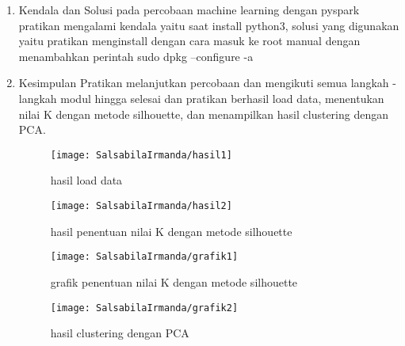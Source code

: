 \begin{enumerate}
\item Kendala dan Solusi
\newline pada percobaan machine learning dengan pyspark pratikan mengalami kendala yaitu saat install python3, solusi yang digunakan yaitu pratikan menginstall dengan cara masuk ke root manual dengan menambahkan perintah sudo dpkg --configure -a

\item Kesimpulan
\newline Pratikan melanjutkan percobaan dan mengikuti semua langkah - langkah modul hingga selesai dan pratikan berhasil load data, menentukan nilai K dengan metode silhouette, dan menampilkan hasil clustering dengan PCA.
\begin{figure}[!ht]
\texttt{[image: SalsabilaIrmanda/hasil1]}
\caption{hasil load data}
\label{gam:hasil}
\end{figure}

\begin{figure}[!ht]
\texttt{[image: SalsabilaIrmanda/hasil2]}
\caption{hasil penentuan nilai K dengan metode silhouette}
\label{gam:hasil}
\end{figure}

\begin{figure}[!ht]
\texttt{[image: SalsabilaIrmanda/grafik1]}
\caption{grafik penentuan nilai K dengan metode silhouette}
\label{gam:hasil}
\end{figure}
\newpage
\begin{figure}[!ht]
\texttt{[image: SalsabilaIrmanda/grafik2]}
\caption{hasil clustering dengan PCA}
\label{gam:hasil}
\end{figure}
\end{enumerate}